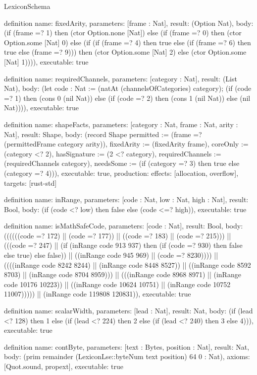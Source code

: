 \begin{lexlean}{LexiconSchema}
\begin{semanticmodule}
definition{
  name: fixedArity,
  parameters: [frame : Nat],
  result: (Option Nat),
  body: (if (frame =? 1) then (ctor Option.none [Nat]) else (if (frame =? 0) then (ctor Option.some [Nat] 0) else (if (if (frame =? 4) then true else (if (frame =? 6) then true else (frame =? 9))) then (ctor Option.some [Nat] 2) else (ctor Option.some [Nat] 1)))),
  executable: true
}

definition{
  name: requiredChannels,
  parameters: [category : Nat],
  result: (List Nat),
  body: (let code : Nat := (natAt (channelsOfCategories) category); (if (code =? 1) then (cons 0 (nil Nat)) else (if (code =? 2) then (cons 1 (nil Nat)) else (nil Nat)))),
  executable: true
}

definition{
  name: shapeFacts,
  parameters: [category : Nat, frame : Nat, arity : Nat],
  result: Shape,
  body: (record Shape {permitted := (frame =? (permittedFrame category arity)), fixedArity := (fixedArity frame), coreOnly := (category <? 2), hasSignature := (2 <? category), requiredChannels := (requiredChannels category), needsSome := (if (category =? 3) then true else (category =? 4))}),
  executable: true,
  production: {effects: [allocation, overflow], targets: [rust-std]}
}

definition{
  name: inRange,
  parameters: [code : Nat, low : Nat, high : Nat],
  result: Bool,
  body: (if (code <? low) then false else (code <=? high)),
  executable: true
}

definition{
  name: isMathSafeCode,
  parameters: [code : Nat],
  result: Bool,
  body: ((((((code =? 172) || (code =? 177)) || ((code =? 183) || (code =? 215))) || (((code =? 247) || (if (inRange code 913 937) then (if (code =? 930) then false else true) else false)) || ((inRange code 945 969) || (code =? 8230)))) || ((((inRange code 8242 8244) || (inRange code 8448 8527)) || ((inRange code 8592 8703) || (inRange code 8704 8959))) || (((inRange code 8968 8971) || (inRange code 10176 10223)) || ((inRange code 10624 10751) || (inRange code 10752 11007))))) || (inRange code 119808 120831)),
  executable: true
}

definition{
  name: scalarWidth,
  parameters: [lead : Nat],
  result: Nat,
  body: (if (lead <? 128) then 1 else (if (lead <? 224) then 2 else (if (lead <? 240) then 3 else 4))),
  executable: true
}

definition{
  name: contByte,
  parameters: [text : Bytes, position : Nat],
  result: Nat,
  body: (prim remainder (LexiconLse::byteNum text position) 64 0 : Nat),
  axioms: [Quot.sound, propext],
  executable: true
}


\end{semanticmodule}
\end{lexlean}
